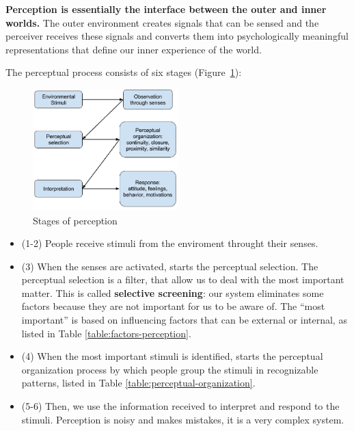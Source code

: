 \documentclass[12pt,article,oneside,a4paper]{memoir}
\begin{document}
\textbf{Perception is essentially the interface between the outer and inner
worlds.} The outer environment creates signals that can be sensed and the
perceiver receives these signals and converts them into psychologically
meaningful representations that define our inner experience of the world.

The perceptual process consists of six stages
(Figure~\ref{fig:perception-stages}):

\begin{figure}
  \centering
  \includegraphics[width=0.5\textwidth]{imgs/perception-stages.png}
  \caption{Stages of perception}
  \label{fig:perception-stages}
\end{figure}

\begin{itemize}
\item (1-2) People receive stimuli from the enviroment throught their senses.
\item (3) When the senses are activated, starts the perceptual selection. The
perceptual selection is a filter, that allow us to deal with the most important
matter. This is called \textbf{selective screening}: our system eliminates some
factors because they are not important for us to be aware of. The ``most
important'' is based on influencing factors that can be external or internal,
as listed in Table \ref{table:factors-perception}.
\item (4) When the most important stimuli is identified, starts the perceptual
organization process by which people group the stimuli in recognizable
patterns, listed in Table  \ref{table:perceptual-organization}.
\item (5-6) Then, we use the information received to interpret and respond to
the stimuli. Perception is noisy and makes mistakes, it is a very complex
system.
\end{itemize}
\end{document}
